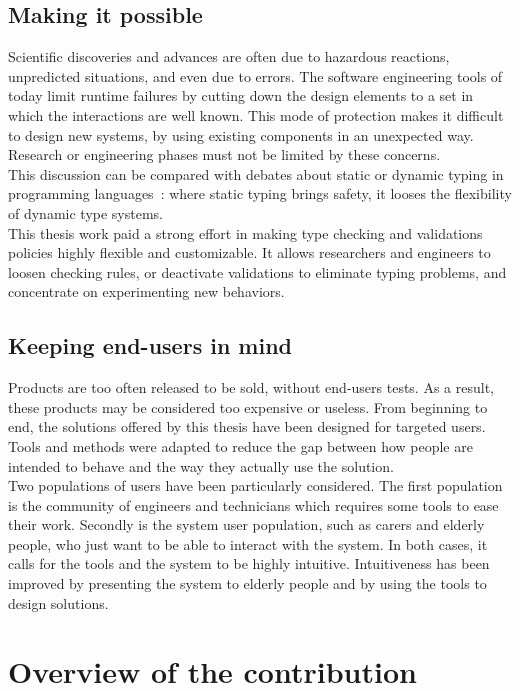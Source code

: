 \subsection{Making it possible}

Scientific discoveries and advances are often due to hazardous reactions, unpredicted situations, and even due to errors. The software engineering tools of today limit runtime failures by cutting down the design elements to a set in which the interactions are well known. This mode of protection makes it difficult to design new systems, by using existing components in an unexpected way. Research or engineering phases must not be limited by these concerns.\\
This discussion can be compared with debates about static or dynamic typing in programming languages~\cite{Tratt:2009,Tratt:2010}: where static typing brings safety, it looses the flexibility of dynamic type systems.\\
This thesis work paid a strong effort in making type checking and validations policies highly flexible and customizable. It allows researchers and engineers to loosen checking rules, or deactivate validations to eliminate typing problems, and concentrate on experimenting new behaviors.

\subsection{Keeping end-users in mind}
\label{subsec:keepUserInMind}
Products are too often released to be sold, without end-users tests. As a result, these products may be considered too expensive or useless. From beginning to end, the solutions offered by this thesis have been designed for targeted users. Tools and methods were adapted to reduce the gap between how people are intended to behave and the way they actually use the solution.\\
Two populations of users have been particularly considered. The first population is the community of engineers and technicians which requires some tools to ease their work. Secondly is the system user population, such as carers and elderly people, who just want to be able to interact with the system. In both cases, it calls for the tools and the system to be highly intuitive. Intuitiveness has been improved by presenting the system to elderly people and by using the tools to design solutions.


\section{Overview of the contribution}

